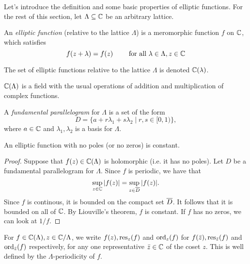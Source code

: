 Let's introduce the definition and some basic properties of elliptic functions.
For the rest of this section,
let $\Lambda \subseteq \mathbb{C}$ be an arbitrary lattice.

\begin{definition}
	An \emph{elliptic function} (relative to the lattice $\Lambda$)
	is a meromorphic function
	$f$ on $\mathbb{C}$, which satisfies
	\begin{equation*}
		f(z + \lambda) = f(z)\qquad\textrm{ for all } \lambda \in \Lambda, z \in \mathbb{C}
	\end{equation*}
\end{definition}

\begin{notation}
	The set of elliptic functions relative to the lattice $\Lambda$ is denoted
	$\mathbb{C}(\lambda)$.
\end{notation}

\begin{remark}
	$\mathbb{C}(\Lambda)$ is a field with the usual operations of 
	addition and multiplication of complex functions.
\end{remark}

\begin{definition}
	A \emph{fundamental parallelogram} for $\Lambda$ is a set of the form
	\begin{equation*}
		D = \{a + r \lambda_1 + s \lambda_2 \mid r, s \in [0, 1)\},
	\end{equation*}
	where $a \in \mathbb{C}$ and $\lambda_1, \lambda_2$ is a basis for $\Lambda$.
\end{definition}

\begin{proposition}
	\label{prop:no-poles}
	An elliptic function with no poles (or no zeros) is constant.
\end{proposition}

\begin{proof}
	Suppose that $f(z)\in \mathbb{C}(\Lambda)$ is holomorphic (i.e. it has no poles).
	Let $D$ be a fundamental
	parallelogram for $\Lambda$. Since $f$ is periodic, we have that
	\begin{equation*}
		\sup_{z \in \mathbb{C}}|f(z)| = \sup_{z \in \overline{D}}|f(z)|.
	\end{equation*}
	Since $f$ is continous, it is bounded on the compact set $\overline{D}$.
	It follows that it is bounded on all of $\mathbb{C}$.
	By Liouville's theorem, $f$ is constant.
	If $f$ has no zeros, we can look at $1/f$.
\end{proof}

\begin{notation}
	For $f \in \mathbb{C}(\Lambda), z \in \mathbb{C}/\Lambda$, we write $f(z), \operatorname{res}_z(f)$ and $\operatorname{ord}_z(f)$ for
	$f(\bar{z}), \operatorname{res}_{\bar{z}}(f)$ and $\operatorname{ord}_{\bar{z}}(f)$ respectively,
	for any one representative
	$\bar{z} \in \mathbb{C}$ of the coset $z$. This is well defined by the
	$\Lambda$-periodicity of $f$.
\end{notation}

